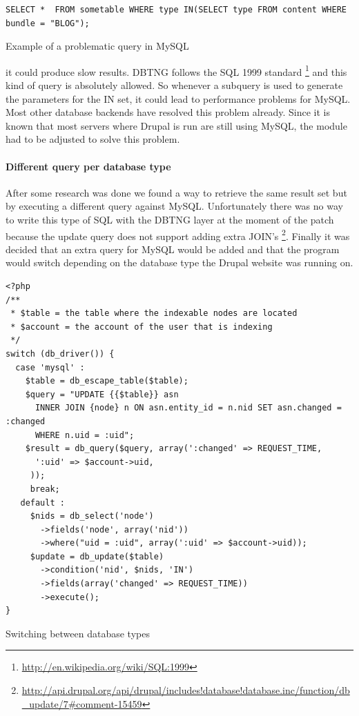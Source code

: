 \begin{verbatim}
SELECT *  FROM sometable WHERE type IN(SELECT type FROM content WHERE bundle = "BLOG");
\end{verbatim}
\caption{Example of a problematic query in MySQL}

it could produce slow results. DBTNG follows the SQL 1999 standard \footnote{\url{http://en.wikipedia.org/wiki/SQL:1999}} and this kind of query is absolutely allowed. So whenever a subquery is used to generate the parameters for the IN set, it could lead to performance problems for MySQL. Most other database backends have resolved this problem already. Since it is known that most servers where Drupal is run are still using MySQL, the module had to be adjusted to solve this problem. 

\paragraph{Different query per database type} After some research was done we found a way to retrieve the same result set but by executing a different query against MySQL. Unfortunately there was no way to write this type of SQL with the DBTNG layer at the moment of the patch because the update query does not support adding extra JOIN's \footnote{\url{http://api.drupal.org/api/drupal/includes!database!database.inc/function/db_update/7\#comment-15459}}. Finally it was decided that an extra query for MySQL would be added and that the program would switch depending on the database type the Drupal website was running on.

\begin{verbatim}
<?php
/**
 * $table = the table where the indexable nodes are located
 * $account = the account of the user that is indexing
 */
switch (db_driver()) {
  case 'mysql' :
    $table = db_escape_table($table);
    $query = "UPDATE {{$table}} asn
      INNER JOIN {node} n ON asn.entity_id = n.nid SET asn.changed = :changed
      WHERE n.uid = :uid";
    $result = db_query($query, array(':changed' => REQUEST_TIME, 
      ':uid' => $account->uid,
     ));
     break;
   default :
     $nids = db_select('node')
       ->fields('node', array('nid'))
       ->where("uid = :uid", array(':uid' => $account->uid));
     $update = db_update($table)
       ->condition('nid', $nids, 'IN')
       ->fields(array('changed' => REQUEST_TIME))
       ->execute();
}
\end{verbatim}
\caption{Switching between database types}



